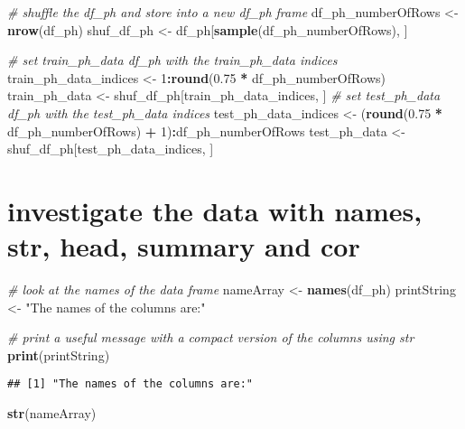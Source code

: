 \documentclass[]{article}
\newenvironment{Shaded}{\begin{snugshade}}{\end{snugshade}}
\newcommand{\KeywordTok}[1]{\textcolor[rgb]{0.13,0.29,0.53}{\textbf{#1}}}
\newcommand{\DecValTok}[1]{\textcolor[rgb]{0.00,0.00,0.81}{#1}}
\newcommand{\FloatTok}[1]{\textcolor[rgb]{0.00,0.00,0.81}{#1}}
\newcommand{\StringTok}[1]{\textcolor[rgb]{0.31,0.60,0.02}{#1}}
\newcommand{\CommentTok}[1]{\textcolor[rgb]{0.56,0.35,0.01}{\textit{#1}}}
\newcommand{\OperatorTok}[1]{\textcolor[rgb]{0.81,0.36,0.00}{\textbf{#1}}}
\newcommand{\NormalTok}[1]{#1}
\begin{document}
\begin{Shaded}
\begin{Highlighting}[]
\CommentTok{# shuffle the df_ph and store into a new df_ph frame}
\NormalTok{df_ph_numberOfRows <-}\StringTok{ }\KeywordTok{nrow}\NormalTok{(df_ph)}
\NormalTok{shuf_df_ph <-}\StringTok{ }\NormalTok{df_ph[}\KeywordTok{sample}\NormalTok{(df_ph_numberOfRows), ]}

\CommentTok{# set train_ph_data df_ph with the train_ph_data indices}
\NormalTok{train_ph_data_indices <-}\StringTok{ }\DecValTok{1}\OperatorTok{:}\KeywordTok{round}\NormalTok{(}\FloatTok{0.75} \OperatorTok{*}\StringTok{ }\NormalTok{df_ph_numberOfRows)}
\NormalTok{train_ph_data <-}\StringTok{ }\NormalTok{shuf_df_ph[train_ph_data_indices, ]}
\CommentTok{# set test_ph_data df_ph with the test_ph_data indices}
\NormalTok{test_ph_data_indices <-}\StringTok{ }\NormalTok{(}\KeywordTok{round}\NormalTok{(}\FloatTok{0.75} \OperatorTok{*}\StringTok{ }\NormalTok{df_ph_numberOfRows) }\OperatorTok{+}\StringTok{ }\DecValTok{1}\NormalTok{)}\OperatorTok{:}\NormalTok{df_ph_numberOfRows}
\NormalTok{test_ph_data <-}\StringTok{ }\NormalTok{shuf_df_ph[test_ph_data_indices, ]}
\end{Highlighting}
\end{Shaded}

\section{investigate the data with names, str, head, summary and
cor}\label{investigate-the-data-with-names-str-head-summary-and-cor-1}

\begin{Shaded}
\begin{Highlighting}[]
\CommentTok{# look at the names of the data frame}
\NormalTok{nameArray <-}\StringTok{ }\KeywordTok{names}\NormalTok{(df_ph)}
\NormalTok{printString <-}\StringTok{ "The names of the columns are:"}

\CommentTok{# print a useful message with a compact version of the columns using str}
\KeywordTok{print}\NormalTok{(printString)}
\end{Highlighting}
\end{Shaded}

\begin{verbatim}
## [1] "The names of the columns are:"
\end{verbatim}

\begin{Shaded}
\begin{Highlighting}[]
\KeywordTok{str}\NormalTok{(nameArray)}
\end{Highlighting}
\end{Shaded}
\end{document}
